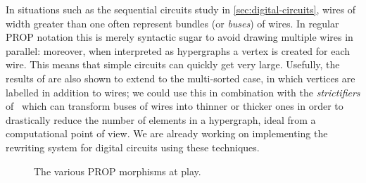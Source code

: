 In situations such as the sequential circuits study in \cref{sec:digital-circuits},
wires of width greater than one often represent bundles (or \emph{buses}) of
wires.
In regular PROP notation this is merely syntactic sugar to avoid drawing
multiple wires in parallel: moreover, when interpreted as hypergraphs a vertex
is created for each wire.
This means that simple circuits can quickly get very large.
Usefully, the results of \cite{bonchi2022stringa} are also shown to extend to the
multi-sorted case, in which vertices are labelled in addition to wires; we could
use this in combination with the \emph{strictifiers} of~\cite{wilson2022string}
which can transform buses of wires into thinner or thicker ones in order to
drastically reduce the number of elements in a hypergraph, ideal from a
computational point of view.
We are already working on implementing the rewriting system for digital circuits
using these techniques.


\begin{figure}
    \centering
    
    \caption{The various PROP morphisms at play.}
    \label{fig:roadmap}
\end{figure}